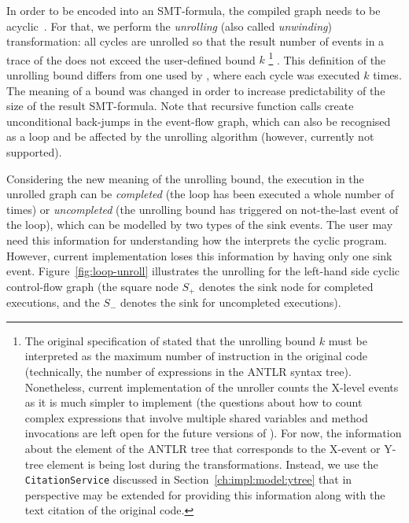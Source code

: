 In order to be encoded into an SMT-formula, the compiled graph needs to be acyclic~\cite{Porthos17b}.
For that, we perform the \textit{unrolling} (also called \textit{unwinding}) transformation: all cycles are unrolled so that the result number of events in a trace of the \xgraph{} does not exceed the user-defined bound $k$%
%
\footnote{The original specification of \porthos[2] stated that the unrolling bound $k$ must be interpreted as the maximum number of instruction in the original code (technically, the number of expressions in the ANTLR syntax tree).
Nonetheless, current implementation of the \xgraph{} unroller counts the X-level events as it is much simpler to implement (the questions about how to count complex expressions that involve multiple shared variables and method invocations are left open for the future versions of \porthos[2]).
For now, the information about the element of the ANTLR tree that corresponds to the X-event or Y-tree element is being lost during the transformations.
Instead, we use the \texttt{CitationService} discussed in Section~\ref{ch:impl:model:ytree} that in perspective may be extended for providing this information along with the text citation of the original code.}
%
.
This definition of the unrolling bound differs from one used by \porthos[1], where each cycle was executed $k$ times.
The meaning of a bound was changed in order to increase predictability of the size of the result SMT-formula.
Note that recursive function calls create unconditional back-jumps in the event-flow graph, which can also be recognised as a loop and be affected by the unrolling algorithm (however, currently not supported).

Considering the new meaning of the unrolling bound, the execution in the unrolled graph can be \textit{completed} (the loop has been executed a whole number of times) or \textit{uncompleted} (the unrolling bound has triggered on not-the-last event of the loop), which can be modelled by two types of the sink events.
The user may need this information for understanding how the \porthos[2] interprets the cyclic program.
However, current implementation loses this information by having only one sink event.
Figure~\ref{fig:loop-unroll} illustrates the unrolling for the left-hand side cyclic control-flow graph (the square node $S_{+}$ denotes the sink node for completed executions, and the $S_{-}$ denotes the sink for uncompleted executions).

